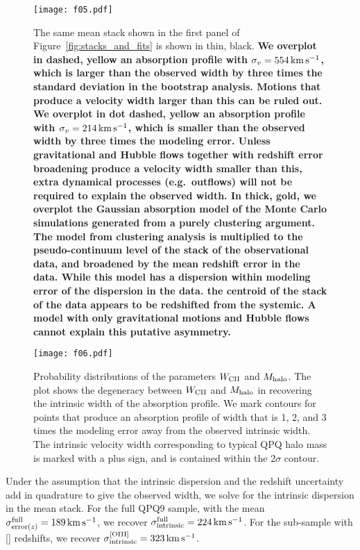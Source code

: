 \documentclass[iop]{emulateapj}
\begin{document}
\begin{figure}
\texttt{[image: f05.pdf]}
\caption{The same  mean stack shown in the first panel of
Figure~\ref{fig:stacks_and_fits} is shown in thin, black.
{\bf We overplot in dashed, yellow an
absorption profile with $\sigma_v=554\,{\rm km\,s^{-1}}$, which is larger than the observed width
by three times the standard deviation in the bootstrap analysis. Motions that produce a velocity
width larger than this can be ruled out. We overplot in dot dashed, yellow an absorption profile with
$\sigma_v=214\,{\rm km\,s^{-1}}$, which is smaller than the observed width by three times the
modeling error. Unless gravitational and Hubble flows together with redshift error broadening
produce a velocity width smaller than this, extra dynamical processes (e.g.\ outflows) will not be
required to explain the observed width.
In thick, gold, we overplot the
Gaussian absorption model of the Monte Carlo simulations generated from a purely clustering
argument. The model from clustering analysis is multiplied to the pseudo-continuum level of the
stack of the observational data, and broadened
by the mean redshift error in the data. While this model has a dispersion within modeling error of the
dispersion in the data. the centroid of the stack of the data appears to be redshifted
from the systemic. A model with only gravitational motions and Hubble flows cannot explain
this putative asymmetry.}
}
\label{fig:monte}
\end{figure}

\begin{figure}
\texttt{[image: f06.pdf]}
\caption{
Probability distributions of the parameters $W_{\rm CII}$ and $M_{\rm halo}$. The plot shows the
degeneracy between $W_{\rm CII}$ and $M_{\rm halo}$ in recovering the intrinsic width of the
absorption profile. We mark contours for points that produce an absorption
profile of width that is 1, 2, and 3 times the modeling error away from the observed intrinsic
width. The intrinsic velocity width corresponding to typical QPQ halo mass is marked with a plus
sign, and is contained within the 2$\sigma$ contour.}
\label{fig:contour}
\end{figure}

Under the assumption that the intrinsic dispersion and the redshift uncertainty add in
quadrature to give the observed width, we solve for the intrinsic dispersion in the 
mean stack. For the full QPQ9 sample, with the mean
$\sigma_{{\rm error}(z)}^{\rm full}=189\,{\rm km\,s^{-1}}$, we recover
$\sigma_{\rm intrinsic}^{\rm full}=224\,{\rm km\,s^{-1}}$. For the sub-sample with []
redshifts, we recover $\sigma_{\rm intrinsic}^{\rm [OIII]}=323\,{\rm km\,s^{-1}}$.
\end{document}
